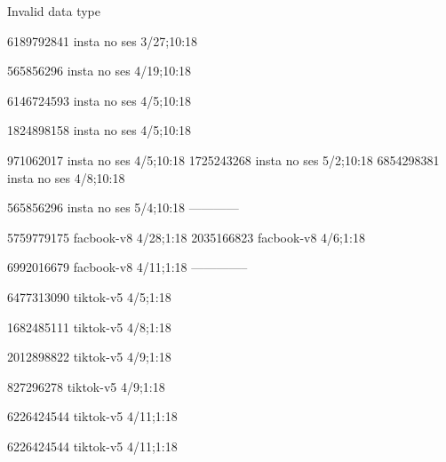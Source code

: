 Invalid data type

6189792841 insta no ses
3/27;10:18

565856296 insta no ses
4/19;10:18

6146724593 insta no ses
4/5;10:18

1824898158 insta no ses
4/5;10:18

971062017 insta no ses
4/5;10:18
1725243268 insta no ses
5/2;10:18
6854298381 insta no ses
4/8;10:18

565856296 insta no ses
5/4;10:18
------------


5759779175 facbook-v8
4/28;1:18
2035166823 facbook-v8
4/6;1:18

6992016679 facbook-v8
4/11;1:18
--------------



6477313090 tiktok-v5
4/5;1:18

1682485111 tiktok-v5
4/8;1:18

2012898822 tiktok-v5
4/9;1:18

827296278 tiktok-v5
4/9;1:18

6226424544 tiktok-v5
4/11;1:18


6226424544 tiktok-v5
4/11;1:18


